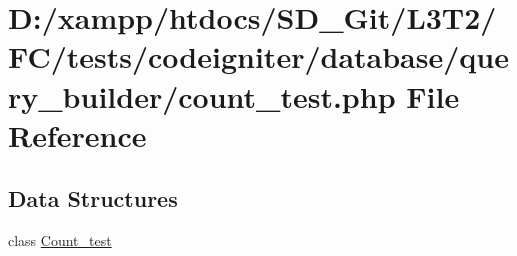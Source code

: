 \hypertarget{tests_2codeigniter_2database_2query__builder_2count__test_8php}{}\section{D\+:/xampp/htdocs/\+S\+D\+\_\+\+Git/\+L3\+T2/\+F\+C/tests/codeigniter/database/query\+\_\+builder/count\+\_\+test.php File Reference}
\label{tests_2codeigniter_2database_2query__builder_2count__test_8php}
\subsection*{Data Structures}
\begin{DoxyCompactItemize}
\item 
class \hyperlink{class_count__test}{Count\+\_\+test}
\end{DoxyCompactItemize}
